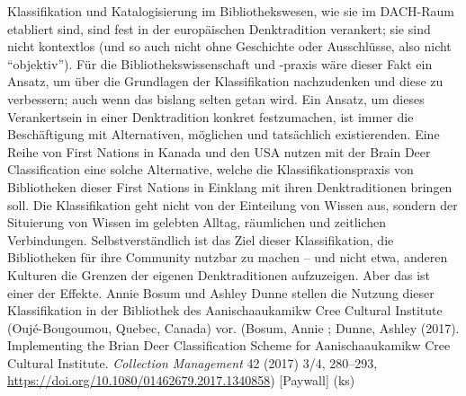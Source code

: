 \documentclass[a4paper,
fontsize=11pt,
oneside,
numbers=noperiodatend,
parskip=half-,
bibliography=totoc,
final
]{scrartcl}
\begin{document}
Klassifikation und Katalogisierung im Bibliothekswesen, wie sie im
DACH-Raum etabliert sind, sind fest in der europäischen Denktradition
verankert; sie sind nicht kontextlos (und so auch nicht ohne Geschichte
oder Ausschlüsse, also nicht \enquote{objektiv}). Für die
Bibliothekswissenschaft und -praxis wäre dieser Fakt ein Ansatz, um über
die Grundlagen der Klassifikation nachzudenken und diese zu verbessern;
auch wenn das bislang selten getan wird. Ein Ansatz, um dieses
Verankertsein in einer Denktradition konkret festzumachen, ist immer die
Beschäftigung mit Alternativen, möglichen und tatsächlich existierenden.
Eine Reihe von First Nations in Kanada und den USA nutzen mit der Brain
Deer Classification eine solche Alternative, welche die
Klassifikationspraxis von Bibliotheken dieser First Nations in Einklang
mit ihren Denktraditionen bringen soll. Die Klassifikation geht nicht
von der Einteilung von Wissen aus, sondern der Situierung von Wissen im
gelebten Alltag, räumlichen und zeitlichen Verbindungen.
Selbstverständlich ist das Ziel dieser Klassifikation, die Bibliotheken
für ihre Community nutzbar zu machen -- und nicht etwa, anderen Kulturen
die Grenzen der eigenen Denktraditionen aufzuzeigen. Aber das ist einer
der Effekte. Annie Bosum und Ashley Dunne stellen die Nutzung dieser
Klassifikation in der Bibliothek des Aanischaaukamikw Cree Cultural
Institute (Oujé-Bougoumou, Quebec, Canada) vor. (Bosum, Annie ; Dunne,
Ashley (2017). Implementing the Brian Deer Classification Scheme for
Aanischaaukamikw Cree Cultural Institute. \emph{Collection Management}
42 (2017) 3/4, 280--293,
\url{https://doi.org/10.1080/01462679.2017.1340858}) {[}Paywall{]} (ks)
\end{document}
